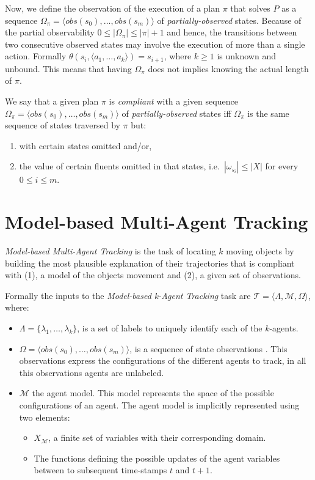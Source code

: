 \documentclass[letterpaper]{article} %
\newcommand{\tup}[1]{{\langle #1 \rangle}}
\begin{document}
Now, we define the observation of the execution of a plan $\pi$ that solves $P$ as a sequence $\Omega_\pi=\tup{obs(s_0), \ldots, obs(s_m)}$ of {\em partially-observed} states. Because of the partial observability $0\leq |\Omega_\pi|\leq |\pi|+1$ and hence, the transitions between two consecutive observed states may involve the execution of more than a single action. Formally $\theta(s_i,\tup{a_1,\ldots,a_k})=s_{i+1}$, where $k\geq 1$ is unknown and unbound. This means that having $\Omega_\pi$ does not implies knowing the actual length of $\pi$.

We say that a given plan $\pi$ is {\em compliant} with a given sequence $\Omega_\pi=\tup{obs(s_0), \ldots, obs(s_m)}$ of {\em partially-observed} states iff $\Omega_\pi$ is the same sequence of states traversed by $\pi$ but:
\begin{enumerate}
\item with certain states omitted and/or,
\item the value of certain fluents omitted in that states, i.e.~$|\omega_{s_i}|\leq |X|$ for every $0\leq i\leq m$.
\end{enumerate}

\section{Model-based Multi-Agent Tracking}
\label{sec:tracking}

{\em Model-based Multi-Agent Tracking} is the task of locating $k$ moving objects by building the most plausible explanation of their trajectories that is compliant with (1), a model of the objects movement and (2), a given set of observations.

Formally the inputs to the {\em Model-based k-Agent Tracking} task are $\mathcal{T}=\tup{\Lambda, \mathcal{M}, \Omega}$, where:
\begin{itemize}
\item $\Lambda=\{\lambda_1,\ldots,\lambda_k\}$, is a set of labels to uniquely identify each of the $k$-agents.
\item $\Omega=\tup{obs(s_0), \ldots, obs(s_m)}$, is a sequence of state observations . This observations express the configurations of the different agents to track, in all this observations agents are unlabeled. 
\item $\mathcal{M}$ the agent model. This model represents the space of the possible configurations of an agent. The agent model is implicitly represented using two elements:
\begin{itemize}
\item $X_\mathcal{M}$, a finite set of variables with their corresponding domain.
\item The functions defining the possible updates of the agent variables between to subsequent time-stamps $t$ and $t+1$. 
\end{itemize}
\end{itemize}
\end{document}
